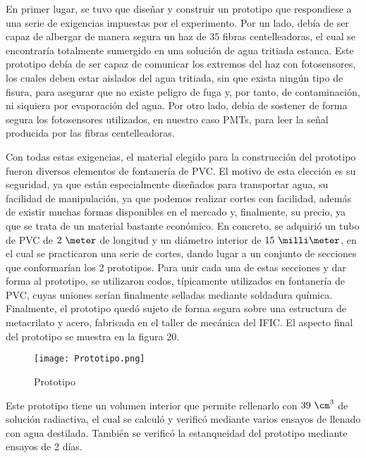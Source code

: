 En primer lugar, se tuvo que diseñar y construir un prototipo que respondiese a una serie de exigencias impuestas por el experimento. Por un lado,  debía de ser capaz de albergar de manera segura  un haz de 35 fibras centelleadoras, el cual se encontraría totalmente sumergido en una solución de agua tritiada estanca. Este prototipo debía de ser capaz de comunicar los extremos del haz con fotosensores, los cuales deben estar aislados del agua tritiada, sin que exista ningún tipo de fisura, para asegurar que no existe peligro de fuga y, por tanto, de contaminación, ni siquiera por evaporación del agua. Por otro lado, debía de sostener de forma segura los fotosensores utilizados, en nuestro caso PMTs, para leer la señal producida por las  fibras centelleadoras.

Con todas estas exigencias, el material elegido para la construcción del prototipo fueron diversos elementos de fontanería de PVC. El motivo de esta elección  es su seguridad, ya que están especialmente diseñados para transportar  agua, su facilidad de manipulación, ya que podemos realizar cortes con facilidad,  además de existir muchas formas disponibles en el mercado y, finalmente,  su precio, ya que se trata de un material bastante económico. 
En concreto, se adquirió un tubo de PVC de $2~\meter$ de longitud y un diámetro interior de $15~\milli\meter$, en el cual se practicaron una serie de cortes, dando lugar a un conjunto de secciones que conformarían los 2 prototipos. Para unir cada una de estas secciones y dar forma al prototipo, se utilizaron codos, típicamente utilizados en fontanería de PVC, cuyas uniones serían finalmente selladas mediante soldadura química. Finalmente, el prototipo quedó sujeto de forma segura sobre una estructura de metacrilato y acero, fabricada en el taller de mecánica del IFIC. El aspecto final del prototipo se muestra en la figura 20.
\begin{figure}[hbtp]
\centering
\texttt{[image: Prototipo.png]}
\caption{ Prototipo\label{prototipo}}
\end{figure}
Este prototipo tiene un volumen interior que permite rellenarlo con   $39~\cm^3$ de solución radiactiva, el cual se calculó y verificó mediante varios ensayos de llenado con agua destilada. También se verificó la estanqueidad del prototipo mediante ensayos de 2 días. 

